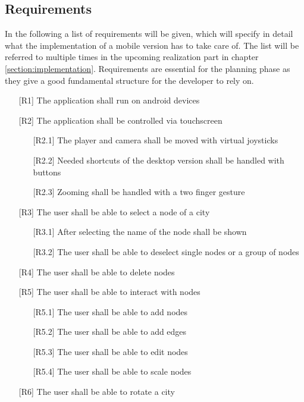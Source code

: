 \subsection{Requirements}
In the following a list of requirements will be given, which will specify in detail what the implementation of a mobile version has to take care of.
The list will be referred to multiple times in the upcoming realization part in chapter \ref{section:implementation}.
Requirements are essential for the planning phase as they give a good fundamental structure for the developer to rely on. \cite{Robertson2012,Stevens2005}
\begin{itemize}
    \item[{[R1]}] The application shall run on \gls{android} devices
    \item[{[R2]}] The application shall be controlled via touchscreen
    \begin{itemize}
        \item [{[R2.1]}] The player and camera shall be moved with virtual joysticks
        \item [{[R2.2]}] Needed shortcuts of the desktop version shall be handled with buttons
        \item [{[R2.3]}] Zooming shall be handled with a two finger gesture
    \end{itemize}
    \item[{[R3]}] The user shall be able to select a node of a \gls{city}
    \begin{itemize}
        \item [{[R3.1]}] After selecting the name of the node shall be shown
        \item [{[R3.2]}] The user shall be able to deselect single nodes or a group of nodes
    \end{itemize}
    \item[{[R4]}] The user shall be able to delete nodes
    \item[{[R5]}] The user shall be able to interact with nodes
    \begin{itemize}
        \item [{[R5.1]}] The user shall be able to add nodes
        \item [{[R5.2]}] The user shall be able to add edges
        \item [{[R5.3]}] The user shall be able to edit nodes
        \item [{[R5.4]}] The user shall be able to scale nodes
    \end{itemize}
    \item[{[R6]}] The user shall be able to rotate a \gls{city}

\end{itemize}
